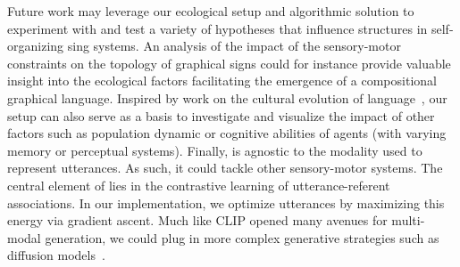 Future work may leverage our ecological setup and algorithmic solution to experiment with and test a variety of hypotheses that influence structures in self-organizing sing systems. An analysis of the impact of the sensory-motor constraints on the topology of graphical signs could for instance provide valuable insight into the ecological factors facilitating the emergence of a compositional graphical language. Inspired by work on the cultural evolution of language~\citep{kirby2001spontaneous}, our setup can also serve as a basis to investigate and visualize the impact of other factors such as population dynamic or cognitive abilities of agents (with varying memory or perceptual systems). Finally, \curves is agnostic to the modality used to represent utterances. As such, it could tackle other sensory-motor systems.  The central element of \curves lies in the contrastive learning of utterance-referent associations. In our implementation, we optimize utterances by maximizing this energy via gradient ascent. Much like CLIP opened many avenues for multi-modal generation, we could plug in more complex generative strategies such as diffusion models~\cite{Rombach2021HighResolutionIS,Saharia2022PhotorealisticTD}. 
